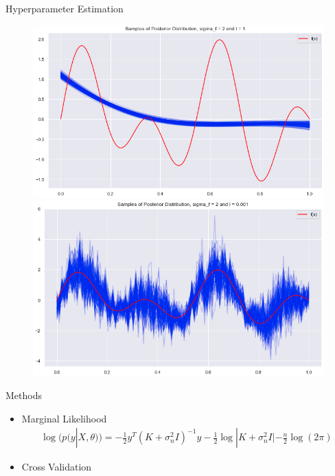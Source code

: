 \documentclass[10pt]{beamer}
\begin{document}
\begin{frame}{Hyperparameter Estimation}{\cite[Chapter 2.3, 5]{RW05}}
\begin{center}
\begin{figure}
\includegraphics[scale=0.21]{images/hyp_posterior_1_example2}
\includegraphics[scale=0.21]{images/hyp_posterior_2_example2}
\end{figure}
\end{center}
\begin{block}{Methods}
\begin{itemize}
\item Marginal Likelihood
\begin{align*}
\log(p(y|X, \theta)) = -\frac{1}{2}y^T (K+\sigma_n^2I)^{-1}y - \frac{1}{2}\log|K+\sigma_n^2I| - \frac{n}{2}\log (2\pi)
\end{align*}
\item Cross Validation
\end{itemize}
\end{block}
\end{frame}
\end{document}
